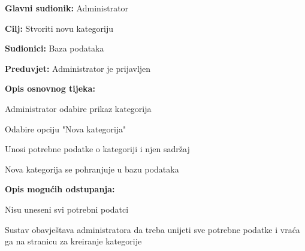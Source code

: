 					\noindent {}
					\begin{packed_item}
						
						\item \textbf{Glavni sudionik:} Administrator
						\item  \textbf{Cilj:} Stvoriti novu kategoriju
						\item  \textbf{Sudionici:} Baza podataka
						\item  \textbf{Preduvjet:} Administrator je prijavljen
						\item  \textbf{Opis osnovnog tijeka:}
						
						\item[] \begin{packed_enum}
							
							\item Administrator odabire prikaz kategorija
							\item Odabire opciju "Nova kategorija"
							\item Unosi potrebne podatke o kategoriji i njen sadržaj
							\item Nova kategorija se pohranjuje u bazu podataka
							
						\end{packed_enum}
						
						\item  \textbf{Opis mogućih odstupanja:}
						
						\item[] \begin{packed_item}
							
							\item[3.a] Nisu uneseni svi potrebni podatci
							\item[] \begin{packed_enum}
								
								\item Sustav obavještava administratora da treba unijeti sve potrebne podatke i vraća ga na stranicu za kreiranje kategorije
							\end{packed_enum}
							
						\end{packed_item}
						
					\end{packed_item}
				

